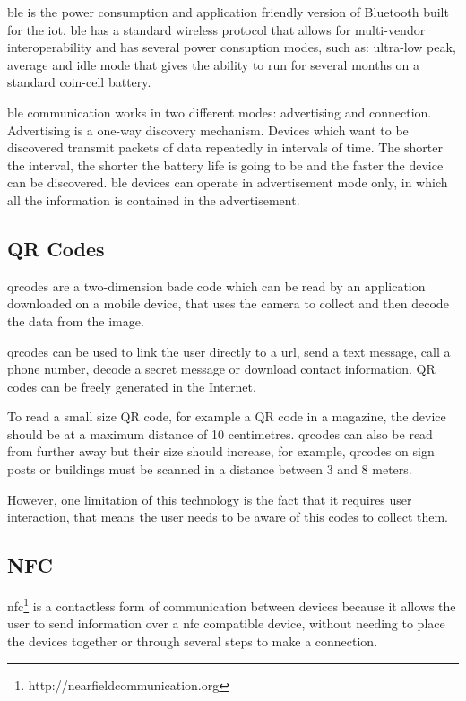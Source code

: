 \gls{ble} is the power consumption and application friendly version of Bluetooth built for the \gls{iot}. \gls{ble} has a standard wireless protocol that allows for multi-vendor interoperability and has several power consuption modes, such as: ultra-low peak, average and idle mode that gives the ability to run for several months on a standard coin-cell battery.

\gls{ble} communication works in two different modes: advertising and connection.
Advertising is a one-way discovery mechanism. Devices which want to be discovered transmit packets of data repeatedly in intervals of time. The shorter the interval, the shorter the battery life is going to be and the faster the device can be discovered.
\gls{ble} devices can operate in advertisement mode only, in which all the information is contained in the advertisement.

\subsection{QR Codes}
\label{subsection:qrcodes}
\gls{qrcodes} are a two-dimension bade code which can be read by an application downloaded on a mobile device, that uses the camera to collect and then decode the data from the image. 

\gls{qrcodes} can be used to link the user directly to a \gls{url}, send a text message, call a phone number, decode a secret message or download contact information. QR codes can be freely generated in the Internet.

To read a small size QR code, for example a QR code in a magazine, the device should be at a maximum distance of 10 centimetres. \gls{qrcodes} can also be read from further away but their size should increase, for example, \gls{qrcodes} on sign posts or buildings must be scanned in a distance between 3 and 8 meters.

However, one limitation of this technology is the fact that it requires user interaction, that means the user needs to be aware of this codes to collect them.

\subsection{NFC}
\label{subsection:nfc}
\gls{nfc}\footnote{http://nearfieldcommunication.org} is a contactless form of communication between devices because it allows the user to send information over a \gls{nfc} compatible device, without needing to place the devices together or through several steps to make a connection. 

